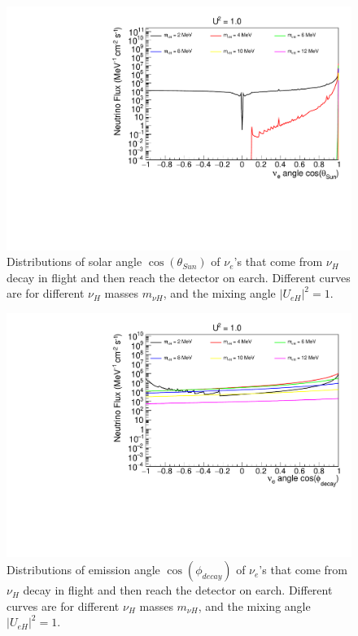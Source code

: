 \documentclass[%
 reprint,
 amsmath,amssymb,
 aps,
 prd,
twocolumn,
]{revtex4-1}
\begin{document}
\begin{figure}[!ht]
\includegraphics[width=0.99\columnwidth]{../plots/DecayInFlightNuLCosthetaSun_U1.0_AllMass_linXlogY.pdf}
\caption{Distributions of solar angle $\cos(\theta_{Sun})$ of $\nu_e$'s that come from $\nu_H$ decay in flight and then reach the detector on earch. Different curves are for different $\nu_H$ masses $m_{\nu H}$, and the mixing angle $|U_{eH}|^2 = 1$.}
\label{fig:DecayInFlightTheta_U1em0_AllMass}
\end{figure}

\begin{figure}[!ht]
\includegraphics[width=0.99\columnwidth]{../plots/DecayInFlightNuLCosphiSun_U1.0_AllMass_linXlogY.pdf}
\caption{Distributions of emission angle $\cos(\phi_{decay})$ of $\nu_e$'s that come from $\nu_H$ decay in flight and then reach the detector on earch. Different curves are for different $\nu_H$ masses $m_{\nu H}$, and the mixing angle $|U_{eH}|^2 = 1$.}
\label{fig:DecayInFlightPhi_U1em0_AllMass}
\end{figure}
\end{document}

